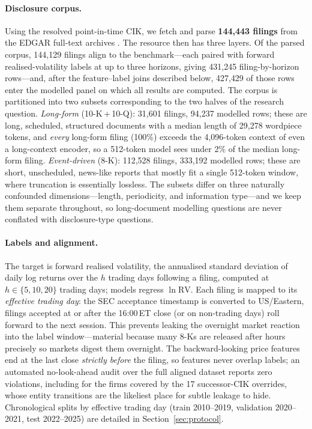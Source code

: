 \paragraph{Disclosure corpus.}
Using the resolved point-in-time CIK, we fetch and parse \textbf{144{,}443 filings} from the EDGAR full-text archives \citep{sec2024edgar}. The resource then has three layers. Of the parsed corpus, 144{,}129 filings align to the benchmark---each paired with forward realised-volatility labels at up to three horizons, giving 431{,}245 filing-by-horizon rows---and, after the feature--label joins described below, 427{,}429 of those rows enter the modelled panel on which all results are computed. The corpus is partitioned into two subsets corresponding to the two halves of the research question. \emph{Long-form} (10-K\,+\,10-Q): 31{,}601 filings, 94{,}237 modelled rows; these are long, scheduled, structured documents with a median length of 29{,}278 wordpiece tokens, and \emph{every} long-form filing (100\%) exceeds the 4{,}096-token context of even a long-context encoder, so a 512-token model sees under 2\% of the median long-form filing. \emph{Event-driven} (8-K): 112{,}528 filings, 333{,}192 modelled rows; these are short, unscheduled, news-like reports that mostly fit a single 512-token window, where truncation is essentially lossless. The subsets differ on three naturally confounded dimensions---length, periodicity, and information type---and we keep them separate throughout, so long-document modelling questions are never conflated with disclosure-type questions.

\paragraph{Labels and alignment.}
The target is forward realised volatility, the annualised standard deviation of daily log returns over the $h$ trading days following a filing, computed at $h\in\{5,10,20\}$ trading days; models regress $\ln\mathrm{RV}$. Each filing is mapped to its \emph{effective trading day}: the SEC acceptance timestamp is converted to US/Eastern, filings accepted at or after the 16:00\,ET close (or on non-trading days) roll forward to the next session. This prevents leaking the overnight market reaction into the label window---material because many 8-Ks are released after hours precisely so markets digest them overnight. The backward-looking price features end at the last close \emph{strictly before} the filing, so features never overlap labels; an automated no-look-ahead audit over the full aligned dataset reports zero violations, including for the firms covered by the 17 successor-CIK overrides, whose entity transitions are the likeliest place for subtle leakage to hide. Chronological splits by effective trading day (train 2010--2019, validation 2020--2021, test 2022--2025) are detailed in Section~\ref{sec:protocol}.

